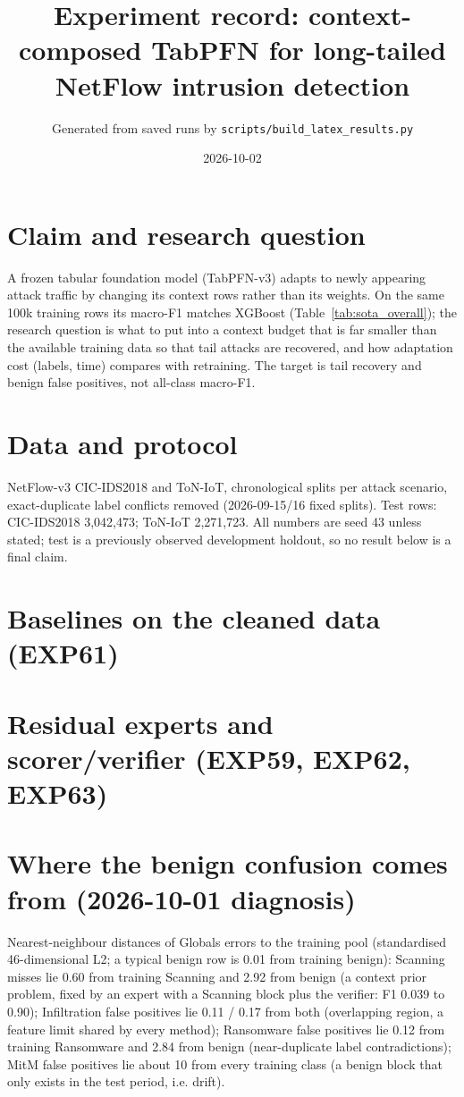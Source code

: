 \documentclass[11pt]{article}
\title{Experiment record: context-composed TabPFN for long-tailed NetFlow intrusion detection}
\author{Generated from saved runs by \texttt{scripts/build\_latex\_results.py}}
\date{2026-10-02}
\begin{document}
\maketitle
\section{Claim and research question}
A frozen tabular foundation model (TabPFN-v3) adapts to newly appearing attack traffic by changing its context rows rather than its weights. On the same 100k training rows its macro-F1 matches XGBoost (Table~\ref{tab:sota_overall}); the research question is what to put into a context budget that is far smaller than the available training data so that tail attacks are recovered, and how adaptation cost (labels, time) compares with retraining. The target is tail recovery and benign false positives, not all-class macro-F1.
\section{Data and protocol}
NetFlow-v3 CIC-IDS2018 and ToN-IoT, chronological splits per attack scenario, exact-duplicate label conflicts removed (2026-09-15/16 fixed splits). Test rows: CIC-IDS2018 3,042,473; ToN-IoT 2,271,723. All numbers are seed 43 unless stated; test is a previously observed development holdout, so no result below is a final claim.
\section{Baselines on the cleaned data (EXP61)}




\section{Residual experts and scorer/verifier (EXP59, EXP62, EXP63)}


\section{Where the benign confusion comes from (2026-10-01 diagnosis)}
Nearest-neighbour distances of Global\textquotesingle s errors to the training pool (standardised 46-dimensional L2; a typical benign row is 0.01 from training benign): Scanning misses lie 0.60 from training Scanning and 2.92 from benign (a context prior problem, fixed by an expert with a Scanning block plus the verifier: F1 0.039 to 0.90); Infiltration false positives lie 0.11 / 0.17 from both (overlapping region, a feature limit shared by every method); Ransomware false positives lie 0.12 from training Ransomware and 2.84 from benign (near-duplicate label contradictions); MitM false positives lie about 10 from every training class (a benign block that only exists in the test period, i.e. drift).
\end{document}
